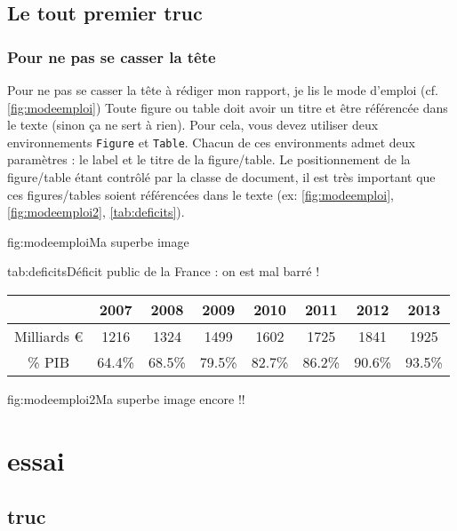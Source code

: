 \documentclass[overfullbox]{polytech}
\begin{document}
\chapter{Le tout premier truc}
\label{chap:toutpremier}

\lipsum[1]

\section{Pour ne pas se casser la tête}

\label{sec:cassetete}

Pour ne pas se casser la tête à rédiger mon rapport, je lis le mode d'emploi (cf. \ref{fig:modeemploi})
Toute figure ou table doit avoir un titre et être référencée dans le texte (sinon ça ne sert à rien).
Pour cela, vous devez utiliser deux environnements \texttt{Figure} et \texttt{Table}. Chacun de ces environments admet deux paramètres : le label et le titre de la figure/table. Le positionnement de la figure/table étant contrôlé par la classe de document, il est très important que ces figures/tables soient référencées dans le texte (ex: \autoref{fig:modeemploi}, \autoref{fig:modeemploi2}, \autoref{tab:deficits}).

\begin{Figure}{fig:modeemploi}{Ma superbe image}
\end{Figure}

\begin{Table}{tab:deficits}{Déficit public de la France : on est mal barré !}
\begin{tabu}{cccccccc}
	&2007	&2008	&2009	&2010	&2011	&2012	&2013\\\hline
Milliards \euro&1216	&1324	&1499	&1602	&1725	&1841	&1925\\\hline
\% PIB	&64.4\%	&68.5\%	&79.5\%	&82.7\%	&86.2\%	&90.6\%	&93.5\%\\\hline
\end{tabu}
\end{Table}

\begin{Figure}{fig:modeemploi2}{Ma superbe image encore !!}
\end{Figure}

\part{essai}
\label{part:essai}

\chapter{truc}
\lipsum[1-20]
\end{document}
